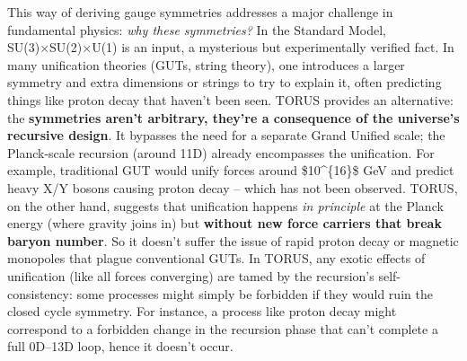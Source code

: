 \documentclass[
]{article}
\begin{document}
{This way of deriving gauge symmetries addresses a major challenge in
fundamental physics: \emph{why these symmetries?} In the Standard Model,
SU(3)×SU(2)×U(1) is an input, a mysterious but experimentally verified
fact. In many unification theories (GUTs, string theory), one introduces
a larger symmetry and extra dimensions or strings to try to explain it,
often predicting things like proton decay that haven't been seen. TORUS
provides an alternative: the \textbf{symmetries aren't arbitrary,
they're a consequence of the universe's recursive design}. It bypasses
the need for a separate Grand Unified scale; the Planck-scale recursion
(around 11D) already encompasses the unification\hspace{0pt}. For
example, traditional GUT would unify forces around \$10\^{}\{16\}\$ GeV
and predict heavy X/Y bosons causing proton decay -- which has not been
observed. TORUS, on the other hand, suggests that unification happens
\emph{in principle} at the Planck energy (where gravity joins in) but
\textbf{without new force carriers that break baryon number}. So it
doesn't suffer the issue of rapid proton decay or magnetic monopoles
that plague conventional GUTs\hspace{0pt}. In TORUS, any exotic effects
of unification (like all forces converging) are tamed by the recursion's
self-consistency: some processes might simply be forbidden if they would
ruin the closed cycle symmetry. For instance, a process like proton
decay might correspond to a forbidden change in the recursion phase that
can't complete a full 0D--13D loop, hence it doesn't occur.

}
\end{document}
